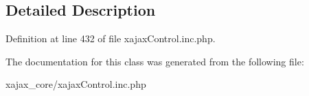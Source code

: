 \subsection{Detailed Description}


Definition at line 432 of file xajaxControl.inc.php.



The documentation for this class was generated from the following file:\begin{DoxyCompactItemize}
\item 
xajax\_\-core/xajaxControl.inc.php\end{DoxyCompactItemize}
